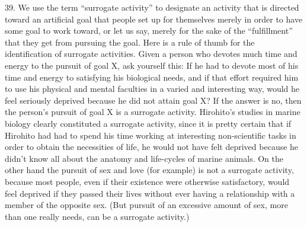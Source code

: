 \documentclass{article}
\begin{document}
39. We use the term “surrogate activity” to designate an activity that is directed toward an artificial 
goal that people set up for themselves merely in order to have some goal to work toward, or let us 
say, merely for the sake of the “fulfillment” that they get from pursuing the goal. Here is a rule of 
thumb for the identification of surrogate activities. Given a person who devotes much time and 
energy to the pursuit of goal X, ask yourself this: If he had to devote most of his time and energy 
to satisfying his biological needs, and if that effort required him to use his physical and mental 
faculties in a varied and interesting way, would he feel seriously deprived because he did not attain 
goal X? If the answer is no, then the person’s pursuit of goal X is a surrogate activity. Hirohito’s 
studies in marine biology clearly constituted a surrogate activity, since it is pretty certain that if 
Hirohito had had to spend his time working at interesting non-scientific tasks in order to obtain the 
necessities of life, he would not have felt deprived because he didn’t know all about the anatomy 
and life-cycles of marine animals. On the other hand the pursuit of sex and love (for example) is 
not a surrogate activity, because most people, even if their existence were otherwise satisfactory, 
would feel deprived if they passed their lives without ever having a relationship with a member of 
the opposite sex. (But pursuit of an excessive amount of sex, more than one really needs, can be 
a surrogate activity.) \vspace{\baselineskip}
\end{document}
